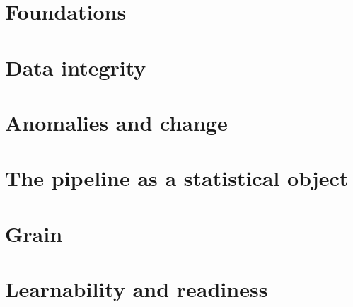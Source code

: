\documentclass[paper=a4,twoside,open=right,fontsize=11pt,parskip=no,headings=standardclasses]{scrbook}
\begin{document}
\frontmatter

\cleardoublepage{}
\tableofcontents



\mainmatter
\part{Foundations}


\part{Data integrity}





\part{Anomalies and change}


\part{The pipeline as a statistical object}




\part{Grain}




\part{Learnability and readiness}




\appendix
\cleardoublepage{}






\backmatter
{}
\printbibliography[heading=bibintoc]
\end{document}
